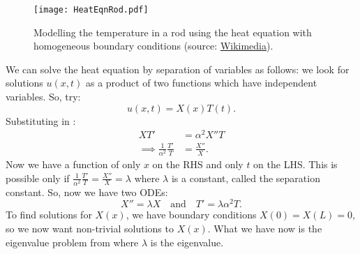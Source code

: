 \begin{figure}[!ht]
	\centering
	\texttt{[image: HeatEqnRod.pdf]}
	\caption{Modelling the temperature in a rod using the heat equation with homogeneous boundary conditions (source: \href{https://commons.wikimedia.org/wiki/File:Temp_Rod_homobc.svg}{Wikimedia}).}
	\label{fig:heateqnrod}
\end{figure}

We can solve the heat equation by separation of variables as follows: we look for solutions $u(x,t)$ as a product of two functions which have independent variables. So, try:
\begin{equation}\label{eq5.2}
	u(x,t) = X(x) T(t).
\end{equation}
Substituting  in :
\begin{align*}
	XT' &= \alpha^2 X''T \\
	\implies \frac{1}{\alpha^2} \frac{T'}{T} &= \frac{X''}{X}.
\end{align*}
Now we have a function of only $x$ on the RHS and only $t$ on the LHS. This is possible only if $\frac{1}{\alpha^2} \frac{T'}{T} = \frac{X''}{X} = \lambda$ where $\lambda$ is a constant, called the separation constant. So, now we have two ODEs:
\[
X'' = \lambda X \quad\text{and}\quad T' = \lambda \alpha^2 T.
\]
To find solutions for $X(x)$, we have boundary conditions $X(0) = X(L) = 0$, so we now want non-trivial solutions to $X(x)$. What we have now is the eigenvalue problem from  where $\lambda$ is the eigenvalue.


